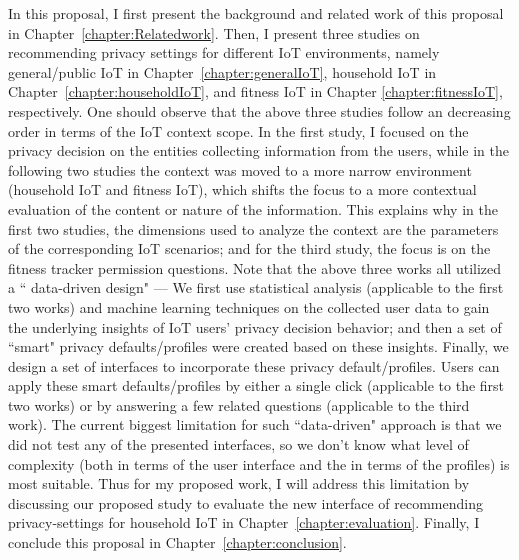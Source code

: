 In this proposal, I first present the background and related work of this proposal in Chapter~\ref{chapter:Relatedwork}. Then, I present three studies on recommending privacy settings for different IoT environments, namely general/public IoT in Chapter~\ref{chapter:generalIoT}, household IoT in Chapter~\ref{chapter:householdIoT}, and fitness IoT in Chapter \ref{chapter:fitnessIoT}, respectively. One should observe that the above three studies follow an decreasing order in terms of the IoT context scope. In the first study, I focused on the privacy decision on the entities collecting information from the users, while in the following two studies the context was moved to a more narrow environment (household IoT and fitness IoT), which shifts the focus to a more contextual evaluation of the content or nature of the information. This explains why in the first two studies, the dimensions used to analyze the context are the parameters of the corresponding IoT scenarios; and for the third study, the focus is on the fitness tracker permission questions. Note that the above three works all utilized a `` data-driven design" --- We first use statistical analysis (applicable to the first two works) and machine learning techniques on the collected user data to gain the underlying insights of IoT users' privacy decision behavior; and then a set of ``smart" privacy defaults/profiles were created based on these insights. Finally, we design a set of interfaces to incorporate these privacy default/profiles. Users can apply these smart defaults/profiles by either a single click (applicable to the first two works) or by answering a few related questions (applicable to the third work). The current biggest limitation for such ``data-driven" approach is that we did not test any of the presented interfaces, so we don't know what level of complexity (both in terms of the user interface and the in terms of the profiles) is most suitable. Thus for my proposed work, I will address this limitation by discussing our proposed study to evaluate the new interface of recommending privacy-settings for household IoT in Chapter~\ref{chapter:evaluation}. Finally, I conclude this proposal in Chapter~\ref{chapter:conclusion}.


